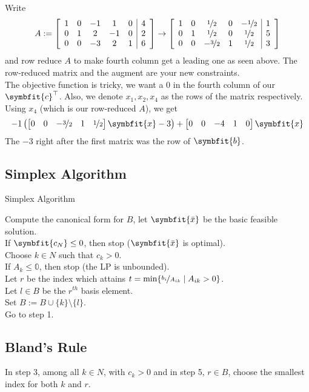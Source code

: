 Write
\[A:=
    \left[\begin{array}{ccccc|c}  
        1 & 0 & -1 & 1 & 0 & 4\\
        0 & 1 & 2 & -1 & 0 & 2\\
        0 & 0 & -3 & 2 & 1 & 6
       \end{array}\right]
    \rightarrow
    \left[\begin{array}{ccccc|c}
        1 & 0 & \nicefrac{1}{2} & 0 & -\nicefrac{1}{2} & 1\\
        0 & 1 & \nicefrac{1}{2} & 0 & \nicefrac{1}{2} & 5\\
        0 & 0 & -\nicefrac{3}{2} & 1 & \nicefrac{1}{2} & 3
    \end{array}\right]
\]
and row reduce $A$ to make fourth column get a leading one as seen above.
The row-reduced matrix and the augment are your new constraints.\\
The objective function is tricky, we want a 0 in the fourth column of our $\symbfit{c}^\top $.
Also, we denote $x_1,x_2,x_4$ as the rows of the matrix respectively.
Using $x_4$ (which is our row-reduced $A$), we get
\[-1\left(
    \begin{bmatrix}
        0 & 0 & -\nicefrac{3}{2} & 1 & \nicefrac{1}{2}
    \end{bmatrix}\symbfit{x}-3\right)+
    \begin{bmatrix}
        0 & 0 & -4 & 1 & 0
    \end{bmatrix}\symbfit{x}
\]
The $-3$ right after the first matrix was the row of $\symbfit{b}$.

\newpage

\subsection{Simplex Algorithm}
\begin{algorithm}
    \caption{Simplex Algorithm}
    Compute the canonical form for $B$, let $\symbfit{\bar{x}}$ be the basic feasible solution.\\
    If $\symbfit{c_N}\le 0$, then stop ($\symbfit{\bar{x}}$ is optimal).\\
    Choose $k\in N$ such that $c_k>0$.\\
    If $A_k\le \mathbb{0}$, then stop (the LP is unbounded).\\
    Let $r$ be the index which attains $t=\min\{\nicefrac{b_i}{A_{ik}}\mid A_{ik}>0\}$.\\
    Let $l\in B$ be the $r^{th}$ basis element.\\
    Set $B:=B\cup\{k\}\setminus\{l\}$.\\
    Go to step 1.
\end{algorithm}

\begin{thmbox}
    \subsection{Bland's Rule}
    In step 3, among all $k\in N$, with $c_k>0$ and in step 5, $r\in B$, 
    choose the smallest index for both $k$ and $r$.
\end{thmbox}


